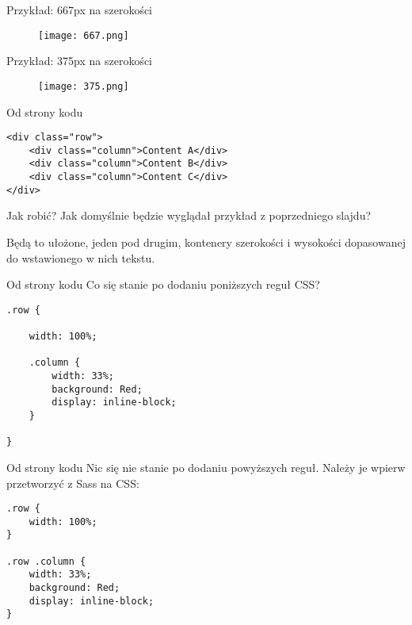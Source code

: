 \begin{frame}{Przykład: 667px na szerokości}
	\begin{figure}[t]
		\centering
		\texttt{[image: 667.png]}
	\end{figure}
\end{frame}

\begin{frame}{Przykład: 375px na szerokości}
	\begin{figure}[t]
		\centering
		\texttt{[image: 375.png]}
	\end{figure}
\end{frame}

\begin{frame}[fragile]{Od strony kodu}
	\begin{lstlisting}
<div class="row">
    <div class="column">Content A</div>
    <div class="column">Content B</div>
    <div class="column">Content C</div>
</div>
	\end{lstlisting}
\end{frame}

\begin{frame}{Jak robić?}	
	Jak domyślnie będzie wyglądał przykład z poprzedniego slajdu?
	
	Będą to ułożone, jeden pod drugim, kontenery szerokości i wysokości dopasowanej do wstawionego w nich tekstu.
\end{frame}

\begin{frame}[fragile]{Od strony kodu}
	Co się stanie po dodaniu poniższych reguł CSS?
	\begin{lstlisting}
.row {
    
    width: 100%;

    .column {
        width: 33%;
        background: Red;
        display: inline-block;
    }

}
	\end{lstlisting}
\end{frame}

\begin{frame}[fragile]{Od strony kodu}
	Nic się nie stanie po dodaniu powyższych reguł. Należy je wpierw przetworzyć z Sass na CSS:
	\begin{lstlisting}
.row {
    width: 100%;
}

.row .column {
    width: 33%;
    background: Red;
    display: inline-block;
}
	\end{lstlisting}
\end{frame}

